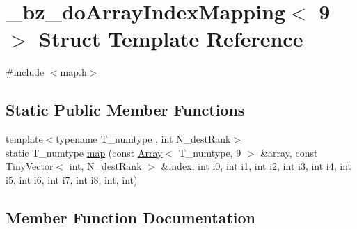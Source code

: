 \hypertarget{struct__bz__doArrayIndexMapping_3_019_01_4}{}\section{\+\_\+bz\+\_\+do\+Array\+Index\+Mapping$<$ 9 $>$ Struct Template Reference}
\label{struct__bz__doArrayIndexMapping_3_019_01_4}


{\ttfamily \#include $<$map.\+h$>$}

\subsection*{Static Public Member Functions}
\begin{DoxyCompactItemize}
\item 
{\footnotesize template$<$typename T\+\_\+numtype , int N\+\_\+dest\+Rank$>$ }\\static T\+\_\+numtype \hyperlink{struct__bz__doArrayIndexMapping_3_019_01_4_ab5bf3dd2e147ccb96c30bd32eec55de0}{map} (const \hyperlink{classArray}{Array}$<$ T\+\_\+numtype, 9 $>$ \&array, const \hyperlink{classTinyVector}{Tiny\+Vector}$<$ int, N\+\_\+dest\+Rank $>$ \&index, int \hyperlink{cephes_8h_aacd2643d920288e61be16787561a4514}{i0}, int \hyperlink{cephes_8h_ab24474d03df1f9adf1700c2c1badd1a5}{i1}, int i2, int i3, int i4, int i5, int i6, int i7, int i8, int, int)
\end{DoxyCompactItemize}


\subsection{Member Function Documentation}
\hypertarget{struct__bz__doArrayIndexMapping_3_019_01_4_ab5bf3dd2e147ccb96c30bd32eec55de0}{}
